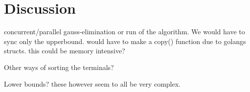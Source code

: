 {
\abnormalparskip{0pt}
\chapter{Discussion}
\label{cha:discussion}
}

concurrent/parallel gauss-elimination or run of the algorithm. We would have to
sync only the upperbound. would have to make a copy() function due to golangs
structs. this could be memory intensive?

Other ways of sorting the terminals?

Lower bounds? these however seem to all be very complex.

